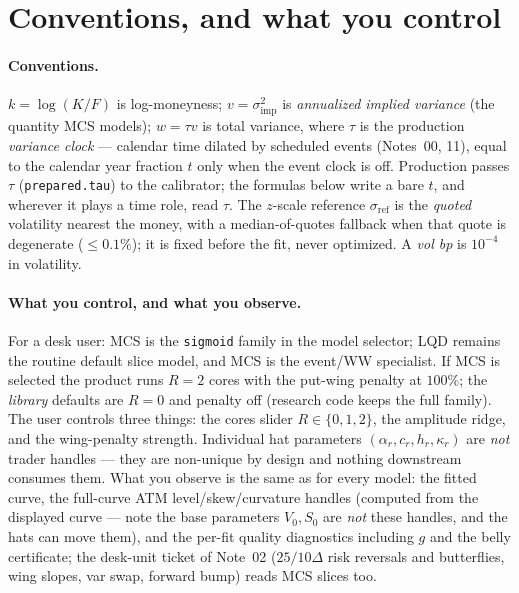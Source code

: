\documentclass[11pt]{article}
\begin{document}
\section*{Conventions, and what you control}

\paragraph{Conventions.} $k=\log(K/F)$ is log-moneyness; $v=\sigma_{\text{imp}}^2$
is \emph{annualized implied variance} (the quantity MCS models);
$w=\tau v$ is total variance, where $\tau$ is the production \emph{variance
clock} --- calendar time dilated by scheduled events (Notes~00, 11), equal to
the calendar year fraction $t$ only when the event clock is off. Production
passes $\tau$ (\texttt{prepared.tau}) to the calibrator; the formulas below
write a bare $t$, and wherever it plays a time role, read $\tau$. The
$z$-scale reference $\sigma_{\text{ref}}$ is the \emph{quoted} volatility
nearest the money, with a median-of-quotes fallback when that quote is
degenerate ($\le0.1\%$); it is fixed before the fit, never optimized. A
\emph{vol bp} is $10^{-4}$ in volatility.

\paragraph{What you control, and what you observe.} For a desk user: MCS is
the \texttt{sigmoid} family in the model selector; LQD remains the routine
default slice model, and MCS is the event/WW specialist. If MCS is selected
the product runs $R=2$ cores with the put-wing penalty at $100\%$; the
\emph{library} defaults are $R=0$ and penalty off (research code keeps the
full family). The user controls three things: the cores slider $R\in\{0,1,2\}$,
the amplitude ridge, and the wing-penalty strength. Individual hat parameters
$(\alpha_r,c_r,h_r,\kappa_r)$ are \emph{not} trader handles --- they are
non-unique by design and nothing downstream consumes them. What you observe
is the same as for every model: the fitted curve, the full-curve ATM
level/skew/curvature handles (computed from the displayed curve --- note the
base parameters $V_0,S_0$ are \emph{not} these handles, and the hats can move
them), and the per-fit quality diagnostics including $g$ and the belly
certificate; the desk-unit ticket of Note~02 ($25/10\Delta$ risk reversals
and butterflies, wing slopes, var swap, forward bump) reads MCS slices too.
\end{document}

